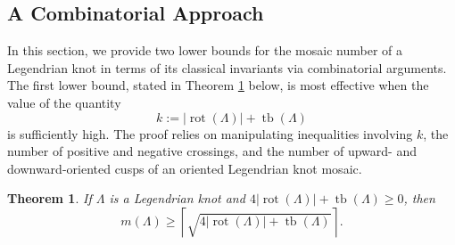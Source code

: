 \documentclass{article}
\DeclareMathOperator{\tb}{tb}
\DeclareMathOperator{\rot}{rot}
\newtheorem{theorem}{Theorem}
\begin{document}
\subsection{A Combinatorial Approach}
\label{combo_bounds}
In this section, we provide two lower bounds for the mosaic number of a Legendrian knot in terms of its classical invariants via combinatorial arguments.
The first lower bound, stated in Theorem \ref{tony_bound} below, is most effective when the value of the quantity 
$$k :=|\rot(\Lambda)|+\tb(\Lambda)$$
is sufficiently high.
The proof relies on manipulating inequalities involving $k$, the number of positive and negative crossings, and the number of upward- and downward-oriented cusps of an oriented Legendrian knot mosaic.

\begin{theorem}\label{tony_bound}
    If $\Lambda$ is a Legendrian knot and $4|\rot(\Lambda)|+\operatorname{tb}(\Lambda)\geq 0$, then \[m(\Lambda) \geq \left\lceil\sqrt{4|\rot(\Lambda)|+\operatorname{tb}(\Lambda)}\right\rceil.\]
\end{theorem}
\end{document}
